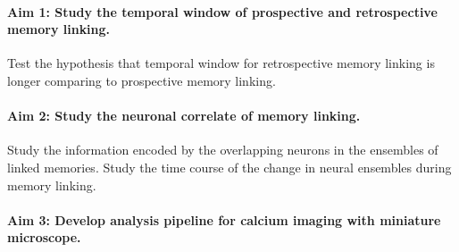 \documentclass[master.tex]{subfiles}
\begin{document}
\paragraph{Aim 1: Study the temporal window of prospective and retrospective
  memory linking.} Test the hypothesis that temporal window for retrospective
memory linking is longer comparing to prospective memory linking.

\paragraph{Aim 2: Study the neuronal correlate of memory linking.} Study the
information encoded by the overlapping neurons in the ensembles of linked
memories. Study the time course of the change in neural ensembles during memory
linking.

\paragraph{Aim 3: Develop analysis pipeline for calcium imaging with miniature microscope.}

\newpage
\end{document}
